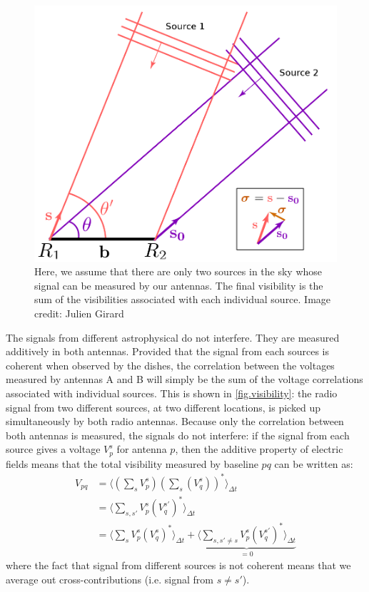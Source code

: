 \begin{figure}[ht]
\centering
\includegraphics[width=.5\textwidth]{images/visibility-measure.png}
\caption{\label{fig.visibility.measure} Here, we assume that there are only two sources in the sky whose signal can be measured by our antennas. The final visibility is the sum of the visibilities associated with each individual source. Image credit: Julien Girard }
\end{figure}

\pg
The signals from different astrophysical do not interfere. They are measured additively in both antennas. Provided that the signal from each sources is coherent when observed by the dishes, the correlation between the voltages measured by antennas A and B will simply be the sum of the voltage correlations associated with individual sources. This is shown in \cref{fig.visibility}: the radio signal from two different sources, at two different locations, is picked up simultaneously by both radio antennas. Because only the correlation between both antennas is measured, the signals do not interfere: if the signal from each source gives a voltage $V_{p}^s$ for antenna $p$, then the additive property of electric fields means that the total visibility measured by baseline $pq$ can be written as:
\begin{align}
V_{pq}  &= \langle \left(\sum_{s} V_{p}^s\right) \left(\sum_{s} (V_{q}^s)\right)^*  \rangle_{\Delta t} \\
        &= \langle \sum_{s,s'} V_{p}^s (V_q^{s'})^*  \rangle_{\Delta t}\\
        &= \langle \sum_s V_{p}^s (V_q^{s})^* \rangle_{\Delta t} + \underbrace{\langle \sum_{s,s'\ne s} V_{p}^s (V_q^{s'})^* \rangle_{\Delta t}}_{=0} \label{eq.spatial.incor}
\end{align}
where the fact that signal from different sources is not coherent means that we average out cross-contributions (i.e. signal from $s\ne s'$). 

